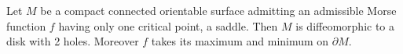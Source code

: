 Let $M$ be a compact connected orientable surface admitting an admissible Morse function $f$ having only one critical point, a saddle. Then $M$ is diffeomorphic to a disk with 2 holes. Moreover $f$ takes its maximum and minimum on $\partial M$.
